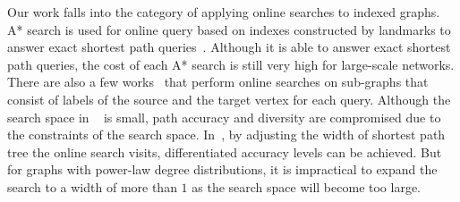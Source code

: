 
Our work falls into the category of applying online searches to indexed graphs. A* search is used for online query based on indexes constructed by landmarks to answer exact shortest path queries~\cite{Goldberg:2005:CSP:1070432.1070455}. Although it is able to answer exact shortest path queries, the cost of each A* search is still very high for large-scale networks. There are also a few works~\cite{Gubichev:2010:FAE:1871437.1871503, 6399472} that perform online searches on sub-graphs that consist of labels of the source and the target vertex for each query. Although the search space in ~\cite{Gubichev:2010:FAE:1871437.1871503} is small, path accuracy and diversity are compromised due to the constraints of the search space. In~\cite{6399472}, by adjusting the width of shortest path tree the online search visits, differentiated accuracy levels can be achieved. But for graphs with power-law degree distributions, it is impractical to expand the search to a width of more than $1$ as the search space will become too large.

